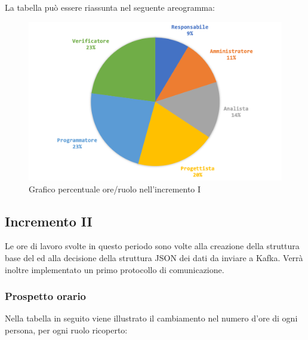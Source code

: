 			La tabella può essere riassunta nel seguente areogramma:
			\begin{figure}[H]
				\centering
				\includegraphics[width=0.8\linewidth]{images/consuntivo/ConsIncr1-2.png}
				\caption{Grafico percentuale ore/ruolo nell'incremento I}
				\label{fig:grafico costi ruolo incremento I}
			\end{figure}
			\pagebreak
		

		\subsection{Incremento II }
		Le ore di lavoro svolte in questo periodo sono volte alla creazione della struttura base del  ed alla decisione della struttura JSON dei dati da inviare a Kafka. Verrà inoltre implementato un primo protocollo di comunicazione.
		\subsubsection{Prospetto orario}
			Nella tabella in seguito viene illustrato il cambiamento nel numero d'ore di ogni persona, per ogni ruolo ricoperto:
			
